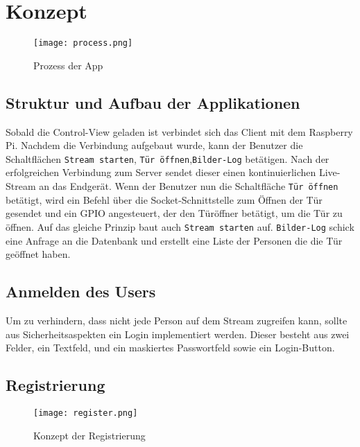 \section{Konzept}

\begin{figure}[h]
  \begin{center}
    \texttt{[image: process.png]}
  		  \caption{Prozess der App}
     \label{fig.Prozess}
  \end{center}
\end{figure}

\subsection{Struktur und Aufbau der Applikationen}

Sobald die Control-View geladen ist verbindet sich das Client mit dem Raspberry Pi. Nachdem die Verbindung aufgebaut wurde, kann der Benutzer die Schaltflächen \texttt{Stream starten}, \texttt{Tür öffnen},\texttt{Bilder-Log} betätigen. Nach der erfolgreichen Verbindung zum Server sendet dieser einen kontinuierlichen Live-Stream an das Endgerät. Wenn der Benutzer nun die Schaltfläche \texttt{Tür öffnen} betätigt, wird ein Befehl über die Socket-Schnittstelle zum Öffnen der Tür gesendet und ein GPIO angesteuert, der den Türöffner betätigt, um die Tür zu öffnen. Auf das gleiche Prinzip baut auch \texttt{Stream starten} auf. \texttt{Bilder-Log} schick eine Anfrage an die Datenbank und erstellt eine Liste der Personen die die Tür geöffnet haben.


\subsection{Anmelden des Users}
Um zu verhindern, dass nicht jede Person auf dem Stream zugreifen kann, sollte aus Sicherheitsaspekten ein Login implementiert werden. Dieser besteht aus zwei Felder, ein Textfeld, und ein maskiertes Passwortfeld sowie ein Login-Button.

\subsection{Registrierung}
\begin{figure}[h]
  \begin{center}
    \texttt{[image: register.png]}
  		  \caption{Konzept der Registrierung}
     \label{fig.Prozess}
  \end{center}
\end{figure}

